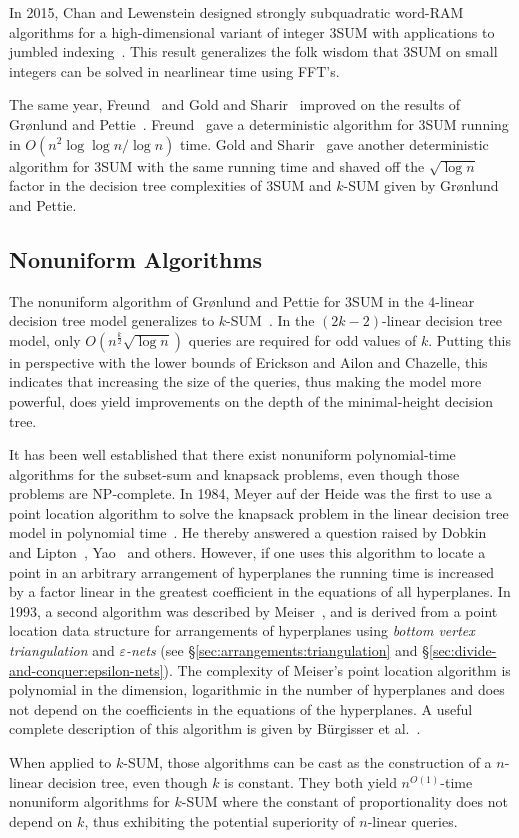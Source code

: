 In 2015, Chan and Lewenstein designed strongly subquadratic word-RAM algorithms
for a high-dimensional variant of integer 3SUM with applications to jumbled
indexing~\cite{CL15}. This result generalizes the folk wisdom that 3SUM on small
integers can be solved in nearlinear time using FFT's.

The same year, Freund~\cite{Fr15} and Gold and Sharir~\cite{GS15}
improved on the results of Gr{\o}nlund and Pettie~\cite{GP18}.
Freund~\cite{Fr15} gave a deterministic algorithm for 3SUM running in \(O(
{n^2\log \log n}/{\log n})\) time. Gold and Sharir~\cite{GS15} gave another
deterministic algorithm for 3SUM with the same running time and shaved off the
$\sqrt{\log n}$ factor in the decision tree complexities of 3SUM and \(k\)-SUM
given by Gr{\o}nlund and Pettie.
%


\subsection{Nonuniform Algorithms}%
\label{sec:problem:sum:nonuniform-algorithms}

The nonuniform algorithm of Gr\o nlund and
Pettie for 3SUM in the \(4\)-linear decision tree model
generalizes to \(k\)-SUM~\cite{GP18}.
In the $(2k-2)$-linear decision tree model,
only $O(n^\frac{k}{2}\sqrt{\log n})$ queries are required for odd values of $k$.
Putting this in perspective with the lower bounds of Erickson and Ailon and
Chazelle, this indicates that increasing the size of the queries, thus making
the model more powerful, does yield
improvements on the depth of the minimal-height decision tree.

It has been well established that there exist nonuniform
polynomial-time algorithms for the subset-sum and knapsack problems, even
though those problems are \textsc{NP}-complete.
%
In 1984,
Meyer auf der Heide was the first to use a point location algorithm to solve
the knapsack problem in the linear decision tree model in polynomial time~\cite{M84}.
He
thereby answered a question raised by Dobkin and Lipton~\cite{DL74,DL78},
Yao~\cite{Y82} and others. However, if one uses this algorithm to locate a
point in an arbitrary arrangement of hyperplanes the running time is increased
by a factor linear in the greatest coefficient in the equations of all
hyperplanes.
%
In 1993,
a second algorithm was described by Meiser~\cite{M93}, and is derived from a
point location data structure for arrangements of hyperplanes using
\emph{bottom vertex triangulation} and \emph{\(\varepsilon\)-nets} (see
\S\ref{sec:arrangements:triangulation} and
\S\ref{sec:divide-and-conquer:epsilon-nets}).
%
The complexity of Meiser's point location algorithm is polynomial in the
dimension, logarithmic in the number of hyperplanes and does not depend on the
coefficients in the equations of the hyperplanes. A useful
complete description of this algorithm is given by Bürgisser et
al.~\cite[Section~3.4]{BCS97}.

When applied to \(k\)-SUM, those algorithms can be cast as the construction of
a \(n\)-linear decision tree, even though \(k\) is constant.
They both yield \(n^{O(1)}\)-time nonuniform algorithms for
\(k\)-SUM where the constant of proportionality does not depend on \(k\), thus
exhibiting the potential superiority of $n$-linear queries.
